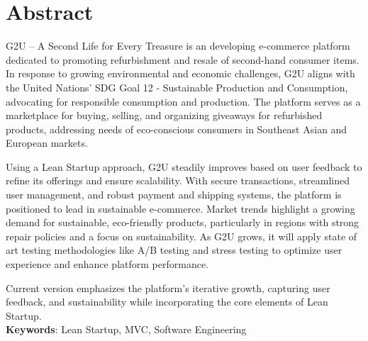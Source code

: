 \chapter*{Abstract}
G2U – A Second Life for Every Treasure is an developing e-commerce platform dedicated to promoting refurbishment and resale of second-hand consumer items. In response to growing environmental and economic challenges, G2U aligns with the United Nations' SDG Goal 12 - Sustainable Production and Consumption, advocating for responsible consumption and production. The platform serves as a marketplace for buying, selling, and organizing giveaways for refurbished products, addressing needs of eco-conscious consumers in Southeast Asian and European markets.
 	
Using a Lean Startup approach, G2U steadily improves based on user feedback to refine its offerings and ensure scalability. With secure transactions, streamlined user management, and robust payment and shipping systems, the platform is positioned to lead in sustainable e-commerce. Market trends highlight a growing demand for sustainable, eco-friendly products, particularly in regions with strong repair policies and a focus on sustainability. As G2U grows, it will apply state of art testing methodologies like A/B testing and stress testing to optimize user experience and enhance platform performance. 

Current version emphasizes the platform’s iterative growth, capturing user feedback, and sustainability while incorporating the core elements of Lean Startup. 
\\ \textbf{Keywords}: Lean Startup, MVC, Software Engineering
\clearpage
